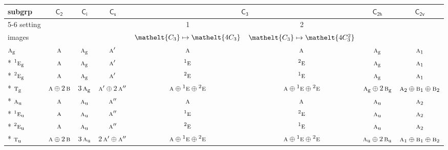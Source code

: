 \documentclass[10pt,a4paper]{article}
\numberwithin{equation}{section}
\newcommand{\eltfont}[1]{{\let\sigma\eltsigma\mathelt{#1}}}
\newcommand{\grp}[1]{\mathsf{#1}}
\newcommand{\irr}[1]{\text{\normalfont\scshape #1}}
\newcommand{\conjpair}[1]{{}^{#1}}
\newcommand{\cls}[1]{\eltfont{#1}}
\newcommand{\ptag}[1]{\mathrm{#1}}
\begin{document}
{\small\begin{longtable}{@{}lccccccc@{}}\toprule
subgrp & \href{C2.pdf}{$\grp{C_{2}}$} & \href{S2.pdf}{$\grp{C_{i}}$} & \href{C1v.pdf}{$\grp{C_{s}}$} & \multicolumn{2}{c}{\href{C3.pdf}{$\grp{C_{3}}$}} & \href{C2h.pdf}{$\grp{C_{2h}}$} & \href{C2v.pdf}{$\grp{C_{2v}}$}\\\cmidrule(lr){5-6}
setting &  &  &  & 1 & 2 &  & \\
images &  &  &  & {\scriptsize $\cls{C_{3}} \mapsto \cls{4C_{3}}$} & {\scriptsize $\cls{C_{3}} \mapsto \cls{4C_{3}^{2}}$} &  & \\\midrule\endhead
\bottomrule\endfoot\endlastfoot
$\irr{a}_{\ptag{g}}$ & $\irr{a}$ & $\irr{a}_{\ptag{g}}$ & $\irr{a}'$ & $\irr{a}$ & $\irr{a}$ & $\irr{a}_{\ptag{g}}$ & $\irr{a}_{1}$\\*
$\conjpair{1}\irr{e}_{\ptag{g}}$ & $\irr{a}$ & $\irr{a}_{\ptag{g}}$ & $\irr{a}'$ & $\conjpair{1}\irr{e}$ & $\conjpair{2}\irr{e}$ & $\irr{a}_{\ptag{g}}$ & $\irr{a}_{1}$\\*
$\conjpair{2}\irr{e}_{\ptag{g}}$ & $\irr{a}$ & $\irr{a}_{\ptag{g}}$ & $\irr{a}'$ & $\conjpair{2}\irr{e}$ & $\conjpair{1}\irr{e}$ & $\irr{a}_{\ptag{g}}$ & $\irr{a}_{1}$\\*
$\irr{t}_{\ptag{g}}$ & $\irr{a}\oplus 2\,\irr{b}$ & $3\,\irr{a}_{\ptag{g}}$ & $\irr{a}'\oplus 2\,\irr{a}''$ & $\irr{a}\oplus \conjpair{1}\irr{e}\oplus \conjpair{2}\irr{e}$ & $\irr{a}\oplus \conjpair{1}\irr{e}\oplus \conjpair{2}\irr{e}$ & $\irr{a}_{\ptag{g}}\oplus 2\,\irr{b}_{\ptag{g}}$ & $\irr{a}_{2}\oplus \irr{b}_{1}\oplus \irr{b}_{2}$\\*
$\irr{a}_{\ptag{u}}$ & $\irr{a}$ & $\irr{a}_{\ptag{u}}$ & $\irr{a}''$ & $\irr{a}$ & $\irr{a}$ & $\irr{a}_{\ptag{u}}$ & $\irr{a}_{2}$\\*
$\conjpair{1}\irr{e}_{\ptag{u}}$ & $\irr{a}$ & $\irr{a}_{\ptag{u}}$ & $\irr{a}''$ & $\conjpair{1}\irr{e}$ & $\conjpair{2}\irr{e}$ & $\irr{a}_{\ptag{u}}$ & $\irr{a}_{2}$\\*
$\conjpair{2}\irr{e}_{\ptag{u}}$ & $\irr{a}$ & $\irr{a}_{\ptag{u}}$ & $\irr{a}''$ & $\conjpair{2}\irr{e}$ & $\conjpair{1}\irr{e}$ & $\irr{a}_{\ptag{u}}$ & $\irr{a}_{2}$\\*
$\irr{t}_{\ptag{u}}$ & $\irr{a}\oplus 2\,\irr{b}$ & $3\,\irr{a}_{\ptag{u}}$ & $2\,\irr{a}'\oplus \irr{a}''$ & $\irr{a}\oplus \conjpair{1}\irr{e}\oplus \conjpair{2}\irr{e}$ & $\irr{a}\oplus \conjpair{1}\irr{e}\oplus \conjpair{2}\irr{e}$ & $\irr{a}_{\ptag{u}}\oplus 2\,\irr{b}_{\ptag{u}}$ & $\irr{a}_{1}\oplus \irr{b}_{1}\oplus \irr{b}_{2}$\\
\bottomrule\end{longtable}}
\end{document}
